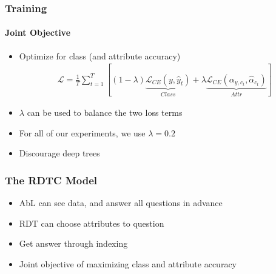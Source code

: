 \documentclass[9pt]{beamer}
\begin{document}
\begin{frame}
\frametitle{Training}
\framesubtitle{Joint Objective}
\begin{itemize}
	\item Optimize for class (and attribute accuracy)
	\begin{align*}
	\mathcal{L} = \frac{1}{T}\sum_{t=1}^{T}\left[(1-\lambda)\underbrace{\mathcal{L}_{CE}(y,\hat{y}_t)}_{Class} + \lambda \underbrace{\mathcal{L}_{CE}(\alpha_{y,c_t},\hat{\alpha}_{c_t})}_{Attr} \right]
	\end{align*}
	\item $\lambda$ can be used to balance the two loss terms
	\item For all of our experiments, we use $\lambda=0.2$
	\item Discourage deep trees%
\end{itemize}
\end{frame}



\begin{frame}
\frametitle{The RDTC Model \cite{alaniz2019explainable}}
\begin{itemize}
	\item AbL can see data, and answer all questions in advance
	\item RDT can choose attributes to question
	\item Get answer through indexing
	\item Joint objective of maximizing class and attribute accuracy
\end{itemize}
\end{frame}
\end{document}
